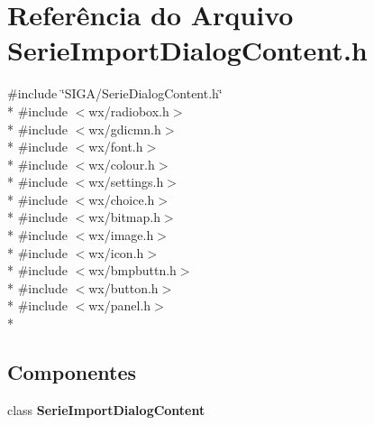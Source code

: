 \section{Referência do Arquivo Serie\+Import\+Dialog\+Content.\+h}
\label{_serie_import_dialog_content_8h}
{\ttfamily \#include \char`\"{}S\+I\+G\+A/\+Serie\+Dialog\+Content.\+h\char`\"{}}\\*
{\ttfamily \#include $<$wx/radiobox.\+h$>$}\\*
{\ttfamily \#include $<$wx/gdicmn.\+h$>$}\\*
{\ttfamily \#include $<$wx/font.\+h$>$}\\*
{\ttfamily \#include $<$wx/colour.\+h$>$}\\*
{\ttfamily \#include $<$wx/settings.\+h$>$}\\*
{\ttfamily \#include $<$wx/choice.\+h$>$}\\*
{\ttfamily \#include $<$wx/bitmap.\+h$>$}\\*
{\ttfamily \#include $<$wx/image.\+h$>$}\\*
{\ttfamily \#include $<$wx/icon.\+h$>$}\\*
{\ttfamily \#include $<$wx/bmpbuttn.\+h$>$}\\*
{\ttfamily \#include $<$wx/button.\+h$>$}\\*
{\ttfamily \#include $<$wx/panel.\+h$>$}\\*
\subsection*{Componentes}
\begin{DoxyCompactItemize}
\item 
class {\bf Serie\+Import\+Dialog\+Content}
\end{DoxyCompactItemize}
